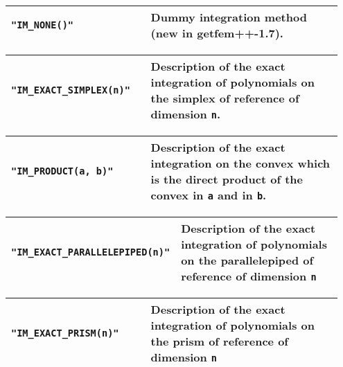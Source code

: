 \begin{center} \begin{tabular}{|m{0.4\linewidth}|m{0.55\linewidth}|} \hline
{\tt "IM\_NONE()"} & Dummy integration method (new in getfem++-1.7).\\ \hline
\end{tabular}  
\begin{tabular}{|m{0.4\linewidth}|m{0.55\linewidth}|} \hline
{\tt "IM\_EXACT\_SIMPLEX(n)"} & Description of the exact integration of polynomials on the simplex of reference of dimension {\tt n}. \\ \hline
\end{tabular}  
\begin{tabular}{|m{0.4\linewidth}|m{0.55\linewidth}|} \hline
{\tt "IM\_PRODUCT(a, b)"} & Description of the exact integration on the convex which is the direct product of the convex in {\tt a} and in {\tt b}.\\ \hline
\end{tabular}  
\begin{tabular}{|m{0.4\linewidth}|m{0.55\linewidth}|} \hline
{\tt "IM\_EXACT\_PARALLELEPIPED(n)"} & Description of the exact integration of polynomials on the parallelepiped of reference of dimension {\tt n}\\ \hline
\end{tabular}  
\begin{tabular}{|m{0.4\linewidth}|m{0.55\linewidth}|} \hline
{\tt "IM\_EXACT\_PRISM(n)"} & Description of the exact integration of polynomials on the prism of reference of dimension {\tt n}\\ \hline
\end{tabular} \end{center}
